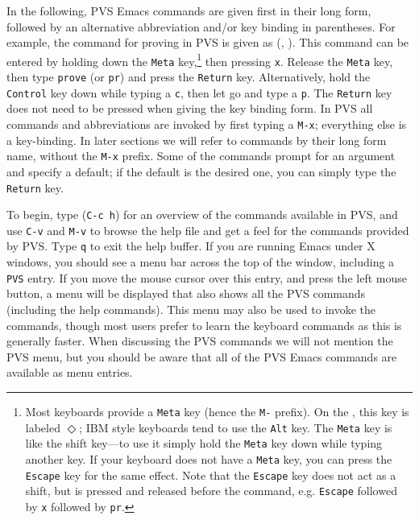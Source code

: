 In the following, PVS Emacs commands are given first in their long form,
followed by an alternative abbreviation and/or key binding in parentheses.
For example, the command for proving in PVS is given as 
(, ).  This command can be entered by holding down the
\texttt{Meta} key,\footnote{Most keyboards provide a \texttt{Meta}
key (hence the \texttt{M-} prefix).  On
the , this key is labeled $\Diamond$;
IBM style keyboards tend to use the \texttt{Alt} key. The \texttt{Meta} key is like the shift key---to use
it simply hold the \texttt{Meta} key down while typing another key.  If
your keyboard does not have a \texttt{Meta} key, you can press the
\texttt{Escape} key for the same effect. Note that the \texttt{Escape} key
does not act as a shift, but is pressed and released before the command,
e.g. \texttt{Escape} followed by \texttt{x} followed by \texttt{pr}.} then
pressing \texttt{x}. Release the \texttt{Meta} key, then type
\texttt{prove} (or \texttt{pr}) and press the \texttt{Return} key.
Alternatively, hold the \texttt{Control} key down while typing a
\texttt{c}, then let go and type a \texttt{p}.  The \texttt{Return} key
does not need to be pressed when giving the key binding form.  In PVS all
commands and abbreviations are invoked by first typing a \texttt{M-x};
everything else is a key-binding.  In later sections we will refer to
commands by their long form name, without the \texttt{M-x} prefix.  Some
of the commands prompt for an argument and specify a default; if the
default is the desired one, you can simply type the \texttt{Return} key.

To begin, type  (\texttt{C-c h}) for an overview of the
commands available in PVS, and use \texttt{C-v} and \texttt{M-v} to browse
the help file and get a feel for the commands provided by PVS.  Type
\texttt{q} to exit the help buffer.  If you are running Emacs under X
windows, you should see a menu bar across the top of the
window, including a \texttt{PVS} entry.  If you move the mouse cursor over
this entry, and press the left mouse button, a menu will be displayed that
also shows all the PVS commands (including the help commands).  This menu
may also be used to invoke the
commands, though most users prefer to learn the keyboard commands as this
is generally faster.  When discussing the PVS commands we will not mention
the PVS menu, but you should be aware that all of the PVS Emacs commands
are available as menu entries.

